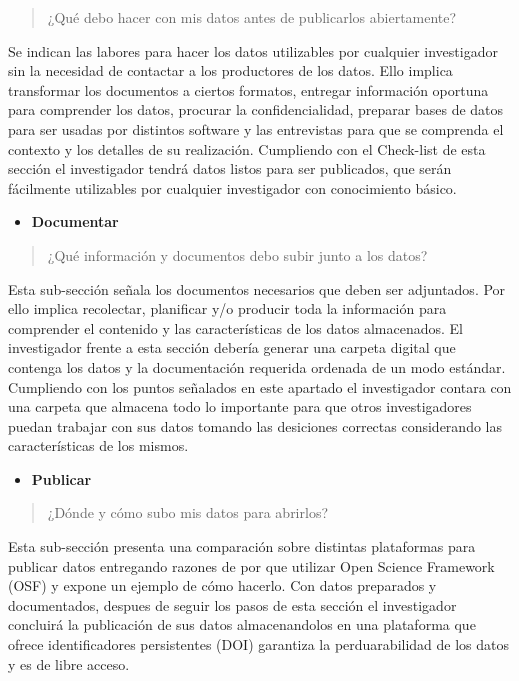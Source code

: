 \documentclass[
  14pt,
]{book}
\providecommand{\tightlist}{%
  \setlength{\itemsep}{0pt}\setlength{\parskip}{0pt}}
\begin{document}
\begin{quote}
¿Qué debo hacer con mis datos antes de publicarlos abiertamente?
\end{quote}

Se indican las labores para hacer los datos utilizables por cualquier investigador sin la necesidad de contactar a los productores de los datos. Ello implica transformar los documentos a ciertos formatos, entregar información oportuna para comprender los datos, procurar la confidencialidad, preparar bases de datos para ser usadas por distintos software y las entrevistas para que se comprenda el contexto y los detalles de su realización. Cumpliendo con el Check-list de esta sección el investigador tendrá datos listos para ser publicados, que serán fácilmente utilizables por cualquier investigador con conocimiento básico.

\begin{itemize}
\tightlist
\item
  \textbf{Documentar}
\end{itemize}

\begin{quote}
¿Qué información y documentos debo subir junto a los datos?
\end{quote}

Esta sub-sección señala los documentos necesarios que deben ser adjuntados. Por ello implica recolectar, planificar y/o producir toda la información para comprender el contenido y las características de los datos almacenados. El investigador frente a esta sección debería generar una carpeta digital que contenga los datos y la documentación requerida ordenada de un modo estándar. Cumpliendo con los puntos señalados en este apartado el investigador contara con una carpeta que almacena todo lo importante para que otros investigadores puedan trabajar con sus datos tomando las desiciones correctas considerando las características de los mismos.

\begin{itemize}
\tightlist
\item
  \textbf{Publicar}
\end{itemize}

\begin{quote}
¿Dónde y cómo subo mis datos para abrirlos?
\end{quote}

Esta sub-sección presenta una comparación sobre distintas plataformas para publicar datos entregando razones de por que utilizar Open Science Framework (OSF) y expone un ejemplo de cómo hacerlo. Con datos preparados y documentados, despues de seguir los pasos de esta sección el investigador concluirá la publicación de sus datos almacenandolos en una plataforma que ofrece identificadores persistentes (DOI) garantiza la perduarabilidad de los datos y es de libre acceso.
\end{document}

